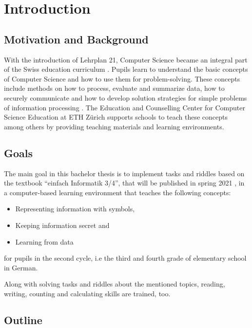 \chapter{Introduction}

\section{Motivation and Background}

With the introduction of Lehrplan 21, Computer Science became an integral part of the Swiss education curriculum \cite{Lehrplan21}. Pupils learn to understand the basic concepts of Computer Science and how to use them for problem-solving. These concepts include methods on how to process, evaluate and summarize data, how to securely communicate and how to develop solution strategies for simple problems of information processing \cite{MedienUndInformatik}. The Education and Counselling Center for Computer Science Education at ETH Zürich \cite{ABZ} supports schools to teach these concepts among others by providing teaching materials and learning environments.

\section{Goals}

The main goal in this bachelor thesis is to implement tasks and riddles based on the textbook “einfach Informatik 3/4”, that will be published in spring 2021 \cite{EinfachInformatik}, in a computer-based learning environment that teaches the following concepts:

\begin{itemize}
    \item Representing information with symbols,
    \item Keeping information secret and
    \item Learning from data
\end{itemize}

for pupils in the second cycle, i.e the third and fourth grade of elementary school in German.

Along with solving tasks and riddles about the mentioned topics, reading, writing, counting and calculating skills are trained, too.

\section{Outline}

